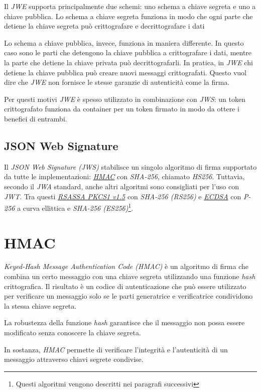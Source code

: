 Il \emph{JWE} supporta principalmente due schemi: uno schema a chiave segreta e uno a chiave pubblica.
Lo schema a chiave segreta funziona in modo che ogni parte che detiene la chiave segreta può crittografare e decrittografare i dati

Lo schema a chiave pubblica, invece, funziona in maniera differente.
In questo caso sono le parti che detengono la chiave pubblica a crittografare i dati, mentre la parte che detiene la chiave privata può decrittografarli.
In pratica, in \emph{JWE} chi detiene la chiave pubblica può creare nuovi messaggi crittografati.
Questo vuol dire che \emph{JWE} non fornisce le stesse garanzie di autenticità come la firma.

Per questi motivi \emph{JWE} è spesso utilizzato in combinazione con \emph{\gls{JWS}}: un token crittografato funziona da container per un token firmato in modo da ottere i benefici di entrambi.

\subsection{JSON Web Signature}
Il \emph{JSON Web Signature (JWS)} stabilisce un singolo algoritmo di firma supportato da tutte le implementazioni: \emph{\hyperref[cap:hmac]{HMAC}} con \emph{\gls{SHA-256}}, chiamato \emph{HS256}.
Tuttavia, secondo il \emph{\gls{JWA}} standard, anche altri algoritmi sono consigliati per l'uso con \emph{JWT}.
Tra questi \emph{\hyperref[cap:rsassa]{RSASSA PKCS1 v1.5}} con \emph{SHA-256 (RS256)} e \emph{\hyperref[cap:ecdsa]{ECDSA}} con \emph{P-256} a curva ellittica e \emph{SHA-256 (ES256)}\footnote{Questi algoritmi vengono descritti nei paragrafi successivi}.


\section{HMAC}
\label{cap:hmac}

\emph{Keyed-Hash Message Authentication Code (HMAC)} è un algoritmo di firma che combina un certo messaggio con una chiave segreta utilizzando una funzione \emph{hash} crittografica.
Il risultato è un codice di autenticazione che può essere utilizzato per verificare un messaggio solo se le parti generatrice e verificatrice condividono la stessa chiave segreta.

La robustezza della funzione \emph{hash} garantisce che il messaggio non possa essere modificato senza conoscere la chiave segreta.

In sostanza, \emph{HMAC} permette di verificare l'integrità e l'autenticità di un messaggio attraverso chiavi segrete condivise.

